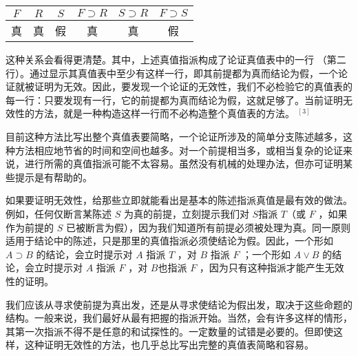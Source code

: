 \begin{center}
\begin{tabular}{|cccccc|}
\hline
$F$ & $R$ & $S$ & $F \supset R$ & $S \supset R$ & $F \supset S$ \\
\hline
真 & 真 & 假 & 真 & 真 & 假 \\
\hline
\end{tabular}
\end{center}

这种关系会看得更清楚。其中，上述真值指派构成了论证真值表中的一行 （第二行）。通过显示其真值表中至少有这样一行，即其前提都为真而结论为假，一个论证就被证明为无效。因此，要发现一个论证的无效性，我们不必检验它的真值表的每一行：只要发现有一行，它的前提都为真而结论为假，这就足够了。当前证明无效性的方法，就是一种构造这样一行而不必构造整个真值表的方法。 ${ }^{[3]}$

目前这种方法比写出整个真值表要简略，一个论证所涉及的简单分支陈述越多，这种方法相应地节省的时间和空间也越多。对一个前提相当多，或相当复杂的论证来说，进行所需的真值指派可能不太容易。虽然没有机械的处理办法，但亦可证明某些提示是有帮助的。

如果要证明无效性，给那些立即就能看出是基本的陈述指派真值是最有效的做法。例如，任何仅断言某陈述 $S$ 为真的前提，立刻提示我们对 $S$指派 $T$（或 $F$ ，如果作为前提的 $S$ 已被断言为假），因为我们知道所有前提必须被处理为真。同一原则适用于结论中的陈述，只是那里的真值指派必须使结论为假。因此，一个形如 $A \supset B$ 的结论，会立时提示对 $A$ 指派 $T$ ，对 $B$ 指派 $F$ ；一个形如 $A \vee B$ 的结论，会立时提示对 $A$ 指派 $F$ ，对 $B$也指派 $F$ ，因为只有这种指派才能产生无效性的证明。

我们应该从寻求使前提为真出发，还是从寻求使结论为假出发，取决于这些命题的结构。一般来说，我们最好从最有把握的指派开始。当然，会有许多这样的情形，其第一次指派不得不是任意的和试探性的。一定数量的试错是必要的。但即使这样，这种证明无效性的方法，也几乎总比写出完整的真值表简略和容易。 